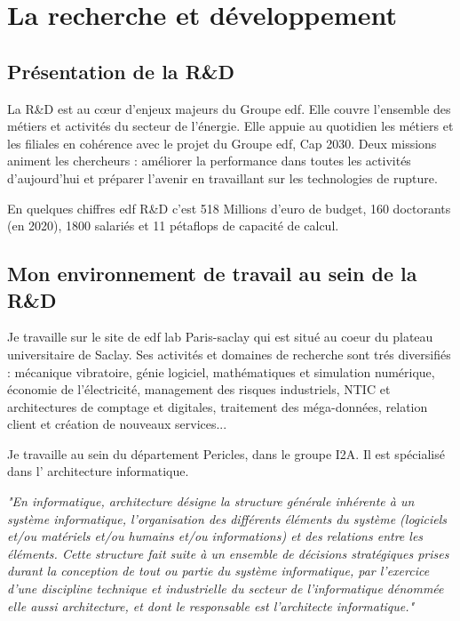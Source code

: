 \justify
\section{La recherche et développement}

\subsection{Présentation de la R\&D}

La R\&D est au cœur d’enjeux majeurs du Groupe \acrshort{edf}. Elle couvre l’ensemble des métiers et activités du secteur de l’énergie. Elle appuie au quotidien les métiers et les filiales en cohérence avec le projet du Groupe \acrshort{edf}, Cap 2030. Deux missions animent les chercheurs : améliorer la performance dans toutes les activités d’aujourd’hui et préparer l’avenir en travaillant sur les technologies de rupture.

En quelques chiffres \acrshort{edf} R\&D c'est 518 Millions d'euro de budget, 160 doctorants (en 2020), 1800 salariés et 11 pétaflops de capacité de calcul.

\subsection{Mon environnement de travail au sein de la R\&D}
Je travaille sur le site de \acrshort{edf} lab Paris-saclay qui est situé au coeur du plateau universitaire de Saclay. Ses activités et domaines de recherche sont trés diversifiés : mécanique vibratoire, génie logiciel, mathématiques et simulation numérique, économie de l'électricité, management des risques industriels, NTIC et architectures de comptage et digitales, traitement des méga-données, relation client et création de nouveaux services...

Je travaille au sein du département Pericles, dans le groupe I2A. Il est spécialisé dans l' architecture informatique.

\textit{
 "En informatique, architecture désigne la structure générale inhérente à un système informatique, l'organisation des différents éléments du système (logiciels et/ou matériels et/ou humains et/ou informations) et des relations entre les éléments. Cette structure fait suite à un ensemble de décisions stratégiques prises durant la conception de tout ou partie du système informatique, par l'exercice d'une discipline technique et industrielle du secteur de l'informatique dénommée elle aussi architecture, et dont le responsable est l'architecte informatique."
} \cite{wikipedia_archi_info}

